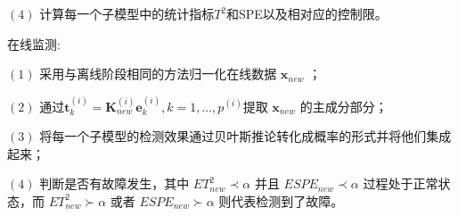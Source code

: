 $(4)$ 计算每一个子模型中的统计指标$T^2$和SPE以及相对应的控制限。

在线监测:

$(1)$ 采用与离线阶段相同的方法归一化在线数据 $\textbf{x}_{new}$ ；

$(2)$ 通过$\textbf{t}^{(i)}_{k}=\textbf{K}_{new}^{(i)}\textbf{e}^{(i)}_{k} , k=1,...,p^{(i)}$提取 $\textbf{x}_{new}$ 的主成分部分；

$(3)$ 将每一个子模型的检测效果通过贝叶斯推论转化成概率的形式并将他们集成起来；

$(4)$ 判断是否有故障发生，其中 $ET^2_{new}\prec\alpha$ 并且 $ESPE_{new}\prec\alpha$ 过程处于正常状态，而 $ET^2_{new}\succ\alpha$ 或者 $ESPE_{new}\succ\alpha$ 则代表检测到了故障。

